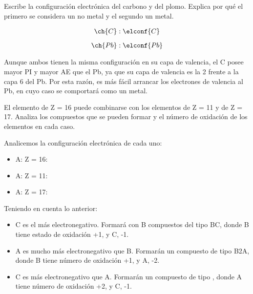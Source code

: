 \begin{question}
    Escribe la configuración electrónica del carbono y del plomo.
    Explica por qué el primero se considera un no metal y
    el segundo un metal.

    \begin{gather*}
        \ch{C}: \elconf{C}\separ
        \ch{Pb}: \elconf{Pb}
    \end{gather*}


    \begin{solu}
        Aunque ambos tienen la misma configuración en su capa de
        valencia, el C posee mayor PI y mayor AE que el Pb, ya que
        su capa de valencia es la 2 frente a la capa 6 del Pb. Por esta
        razón, es más fácil arrancar los electrones de valencia al Pb,
        en cuyo caso se comportará como un metal.
    \end{solu}

\end{question}

\begin{question}
    El elemento de Z = 16 puede combinarse con los elementos
    de Z = 11 y de Z = 17.
    Analiza los compuestos
    que se pueden formar y el número de oxidación de los
    elementos en cada caso.


    \begin{solu}
        Analicemos la configuración electrónica de cada uno:

        \begin{itemize}
            \item A: Z = 16: 
            \item A: Z = 11: 
            \item A: Z = 17: 
        \end{itemize}
        Teniendo en cuenta lo anterior:
        \begin{itemize}
            \item C es el más electronegativo. Formará con B compuestos del
            tipo BC, donde B tiene estado de oxidación +1, y C, -1.
            \item A es mucho más electronegativo que B. Formarán un compuesto
            de tipo B2A, donde B tiene número de oxidación +1,
            y A, -2.
            \item C es más electronegativo que A. Formarán un compuesto
            de tipo , donde A tiene número de oxidación +2, y
            C, -1.
        \end{itemize}
    \end{solu}

\end{question}

